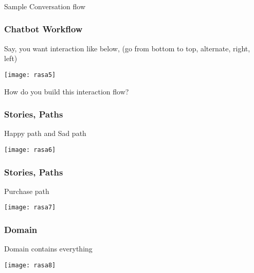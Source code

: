 \begin{frame}[fragile]\frametitle{}
\begin{center}
{\Large Sample Conversation flow}

\end{center}
\end{frame}


\begin{frame}[fragile]\frametitle{Chatbot Workflow}

Say, you want interaction like below, (go from bottom to top, alternate, right, left)

\begin{center}
\texttt{[image: rasa5]}
\end{center}

How do you build this interaction flow?


\end{frame}


\begin{frame}[fragile]\frametitle{Stories, Paths}

Happy path and Sad path

\begin{center}
\texttt{[image: rasa6]}
\end{center}



\end{frame}


\begin{frame}[fragile]\frametitle{Stories, Paths}

Purchase path

\begin{center}
\texttt{[image: rasa7]}
\end{center}



\end{frame}

\begin{frame}[fragile]\frametitle{Domain}

Domain contains everything

\begin{center}
\texttt{[image: rasa8]}
\end{center}



\end{frame}

